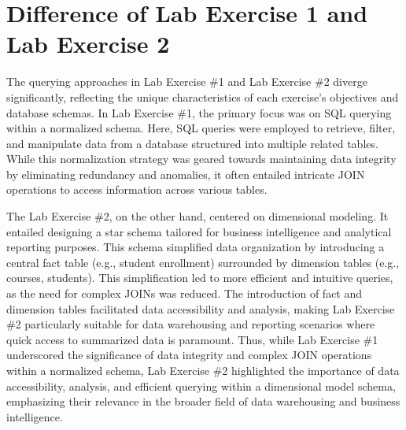 \section{Difference of Lab Exercise 1 and Lab Exercise 2}

The querying approaches in Lab Exercise \#1 and Lab Exercise \#2 diverge significantly, reflecting the unique characteristics of each exercise's objectives and database schemas. In Lab Exercise \#1, the primary focus was on SQL querying within a normalized schema. Here, SQL queries were employed to retrieve, filter, and manipulate data from a database structured into multiple related tables. While this normalization strategy was geared towards maintaining data integrity by eliminating redundancy and anomalies, it often entailed intricate JOIN operations to access information across various tables. 

The Lab Exercise \#2, on the other hand, centered on dimensional modeling. It entailed designing a star schema tailored for business intelligence and analytical reporting purposes. This schema simplified data organization by introducing a central fact table (e.g., student enrollment) surrounded by dimension tables (e.g., courses, students). This simplification led to more efficient and intuitive queries, as the need for complex JOINs was reduced. The introduction of fact and dimension tables facilitated data accessibility and analysis, making Lab Exercise \#2 particularly suitable for data warehousing and reporting scenarios where quick access to summarized data is paramount. Thus, while Lab Exercise \#1 underscored the significance of data integrity and complex JOIN operations within a normalized schema, Lab Exercise \#2 highlighted the importance of data accessibility, analysis, and efficient querying within a dimensional model schema, emphasizing their relevance in the broader field of data warehousing and business intelligence.
